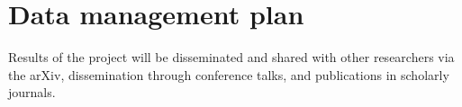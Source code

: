 \documentclass[11pt]{article}
\begin{document}
\section*{Data management plan}

\noindent Results of the project will be disseminated and shared with other researchers via the arXiv, dissemination through conference talks, and publications in scholarly journals.
\end{document}

